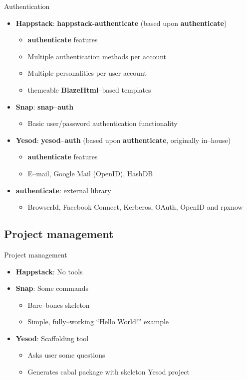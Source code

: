 \documentclass[10pt,usenames,dvipsnames]{beamer}
\begin{document}
	\begin{frame}{Authentication}
		\begin{itemize}
		\item \textbf{Happstack}: \textbf{happstack-authenticate} (based upon \textbf{authenticate})
			\begin{itemize}
			\item \textbf{authenticate} features
			\item Multiple authentication methods per account
			\item Multiple personalities per user account
			\item themeable \textbf{BlazeHtml}--based templates
			\end{itemize}
		\item\textbf{Snap}: \textbf{snap--auth}
			\begin{itemize}
			\item Basic user/password authentication functionality
			\end{itemize}
		\item \textbf{Yesod}: \textbf{yesod--auth} (based upon \textbf{authenticate}, originally in--house)
			\begin{itemize}
			\item \textbf{authenticate} features
			\item E--mail, Google Mail (OpenID), HashDB
			\end{itemize}
		\end{itemize}
		\begin{itemize}
		\item \textbf{authenticate}: external library
			\begin{itemize}
			\item BrowserId, Facebook Connect, Kerberos, OAuth, OpenID and rpxnow
			\end{itemize}
		\end{itemize}
	\end{frame}

	\subsection*{Project management}

	\begin{frame}{Project management}
		\begin{itemize}
		\item \textbf{Happstack}: No tools
		\item\textbf{Snap}: Some commands
		\begin{itemize}
			\item Bare--bones skeleton
			\item Simple, fully--working ``Hello World!'' example
		\end{itemize}
		\item \textbf{Yesod}: Scaffolding tool
		\begin{itemize}
			\item Asks user some questions
			\item Generates cabal package with skeleton Yesod project
		\end{itemize}
		\end{itemize}
	\end{frame}
	
\end{document}
